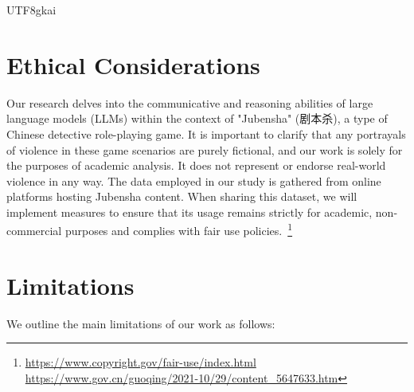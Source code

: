 \documentclass[11pt]{article}
\begin{document}

\begin{CJK}{UTF8}{gkai}
\section*{Ethical Considerations}


Our research delves into the communicative and reasoning abilities of large language models (LLMs) within the context of "Jubensha" (剧本杀), a type of Chinese detective role-playing game. It is important to clarify that any portrayals of violence in these game scenarios are purely fictional, and our work is solely for the purposes of academic analysis. It does not represent or endorse real-world violence in any way. The data employed in our study is gathered from online platforms hosting Jubensha content. When sharing this dataset, we will implement measures to ensure that its usage remains strictly for academic, non-commercial purposes and complies with fair use policies.~\footnote{\url{https://www.copyright.gov/fair-use/index.html}\\\url{https://www.gov.cn/guoqing/2021-10/29/content_5647633.htm}}\end{CJK}

\section*{Limitations}

We outline the main limitations of our work as follows:
\end{document}
